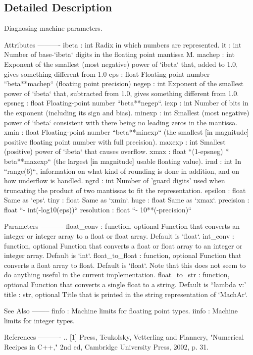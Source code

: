 \subsection{Detailed Description}
\begin{DoxyVerb}Diagnosing machine parameters.

Attributes
----------
ibeta : int
    Radix in which numbers are represented.
it : int
    Number of base-`ibeta` digits in the floating point mantissa M.
machep : int
    Exponent of the smallest (most negative) power of `ibeta` that,
    added to 1.0, gives something different from 1.0
eps : float
    Floating-point number ``beta**machep`` (floating point precision)
negep : int
    Exponent of the smallest power of `ibeta` that, subtracted
    from 1.0, gives something different from 1.0.
epsneg : float
    Floating-point number ``beta**negep``.
iexp : int
    Number of bits in the exponent (including its sign and bias).
minexp : int
    Smallest (most negative) power of `ibeta` consistent with there
    being no leading zeros in the mantissa.
xmin : float
    Floating-point number ``beta**minexp`` (the smallest [in
    magnitude] positive floating point number with full precision).
maxexp : int
    Smallest (positive) power of `ibeta` that causes overflow.
xmax : float
    ``(1-epsneg) * beta**maxexp`` (the largest [in magnitude]
    usable floating value).
irnd : int
    In ``range(6)``, information on what kind of rounding is done
    in addition, and on how underflow is handled.
ngrd : int
    Number of 'guard digits' used when truncating the product
    of two mantissas to fit the representation.
epsilon : float
    Same as `eps`.
tiny : float
    Same as `xmin`.
huge : float
    Same as `xmax`.
precision : float
    ``- int(-log10(eps))``
resolution : float
    ``- 10**(-precision)``

Parameters
----------
float_conv : function, optional
    Function that converts an integer or integer array to a float
    or float array. Default is `float`.
int_conv : function, optional
    Function that converts a float or float array to an integer or
    integer array. Default is `int`.
float_to_float : function, optional
    Function that converts a float array to float. Default is `float`.
    Note that this does not seem to do anything useful in the current
    implementation.
float_to_str : function, optional
    Function that converts a single float to a string. Default is
    ``lambda v:'%
title : str, optional
    Title that is printed in the string representation of `MachAr`.

See Also
--------
finfo : Machine limits for floating point types.
iinfo : Machine limits for integer types.

References
----------
.. [1] Press, Teukolsky, Vetterling and Flannery,
       "Numerical Recipes in C++," 2nd ed,
       Cambridge University Press, 2002, p. 31.\end{DoxyVerb}
 

